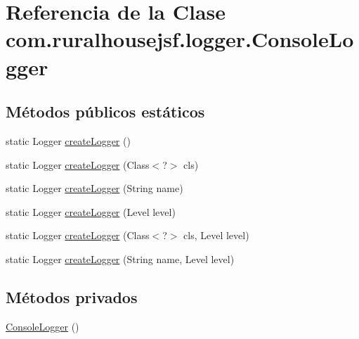 \hypertarget{a00220}{}\section{Referencia de la Clase com.\+ruralhousejsf.\+logger.\+Console\+Logger}
\label{a00220}
\subsection*{Métodos públicos estáticos}
\begin{DoxyCompactItemize}
\item 
static Logger \mbox{\hyperlink{a00220_a520321643663e37d95761134a35505cd}{create\+Logger}} ()
\item 
static Logger \mbox{\hyperlink{a00220_a7260bb499fc46999ae7c583aa7227a9e}{create\+Logger}} (Class$<$?$>$ cls)
\item 
static Logger \mbox{\hyperlink{a00220_aede603ef1d6e7732ebc86740306a0d76}{create\+Logger}} (String name)
\item 
static Logger \mbox{\hyperlink{a00220_ac2b1539989c5ffe217126480d0cd1d0f}{create\+Logger}} (Level level)
\item 
static Logger \mbox{\hyperlink{a00220_aff02e8e2cb59129f6cd218d251f999af}{create\+Logger}} (Class$<$?$>$ cls, Level level)
\item 
static Logger \mbox{\hyperlink{a00220_ab24910a5c796c6dd0a686067a856febd}{create\+Logger}} (String name, Level level)
\end{DoxyCompactItemize}
\subsection*{Métodos privados}
\begin{DoxyCompactItemize}
\item 
\mbox{\hyperlink{a00220_a51a46eb118739bc4e500b3f257ca170e}{Console\+Logger}} ()
\end{DoxyCompactItemize}

